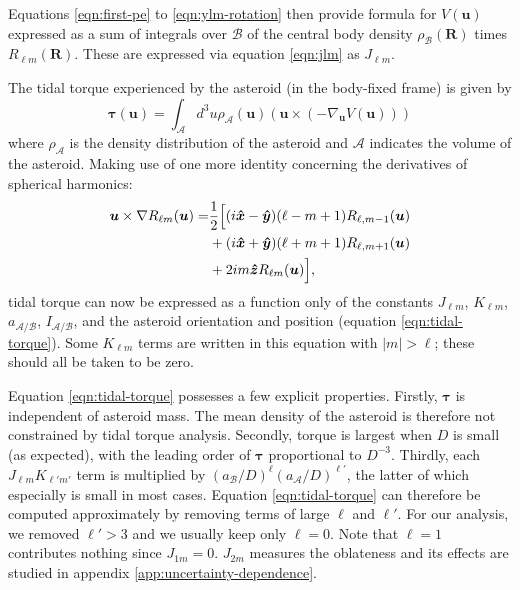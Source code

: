 Equations \ref{eqn:first-pe} to \ref{eqn:ylm-rotation} then provide formula for $V(\bm u)$ expressed as a sum of integrals over $\mathcal{B}$ of the central body density $\rho_\mathcal{B}(\bm R)$ times $R_{\ell m}(\bm R)$. These are expressed via equation \ref{eqn:jlm} as $J_{\ell m}$.

The tidal torque experienced by the asteroid (in the body-fixed frame) is given by
\begin{equation}
  \bm{\tau}(\bm u) = \int_\mathcal{A} d^3 u \rho_\mathcal{A}(\bm u) (\bm u \times (-\nabla_{\bm u} V(\bm u)))
\end{equation}
where $\rho_\mathcal{A}$ is the density distribution of the asteroid and $\mathcal{A}$ indicates the volume of the asteroid. Making use of one more identity concerning the derivatives of spherical harmonics:
\begin{equation}
  \begin{split}
  \bm u \times \nabla R_{\ell m}(\bm u)=&\frac{1}{2}\Big[(i\bm{\hat{x}} - \bm{\hat{y}})(\ell-m+1)R_{\ell,m-1}(\bm u)\\
  &+(i\bm{\hat{x}}+\bm{\hat{y}})(\ell+m+1)R_{\ell,m+1}(\bm u)\\
  & +2im\bm{\hat{z}} R_{\ell m}(\bm u)\Big],
  \end{split}
\end{equation}
tidal torque can now be expressed as a function only of the constants $J_{\ell m}$, $K_{\ell m}$, $a_\mathcal{A/B}$, $I_\mathcal{A/B}$, and the asteroid orientation and position (equation \ref{eqn:tidal-torque}). Some $K_{\ell m}$ terms are written in this equation with $|m|>\ell$; these should all be taken to be zero.

Equation \ref{eqn:tidal-torque} possesses a few explicit properties. Firstly, $\bm \tau$ is independent of asteroid mass. The mean density of the asteroid is therefore not constrained by tidal torque analysis. Secondly, torque is largest when $D$ is small (as expected), with the leading order of $\bm \tau$ proportional to $D^{-3}$. Thirdly, each $J_{\ell m}K_{\ell' m'}$ term is multiplied by $(a_\mathcal{B}/D)^\ell (a_\mathcal{A}/D)^{\ell'}$, the latter of which especially is small in most cases. Equation \ref{eqn:tidal-torque} can therefore be computed approximately by removing terms of large $\ell$ and $\ell'$. For our analysis, we removed $\ell' > 3$ and we usually keep only $\ell=0$. Note that $\ell=1$ contributes nothing since $J_{1m}=0$. $J_{2m}$ measures the oblateness and its effects are studied in appendix \ref{app:uncertainty-dependence}.

